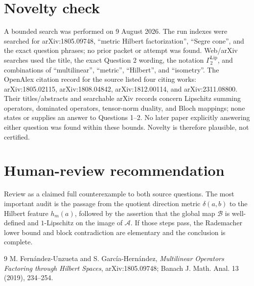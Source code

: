 \documentclass[11pt]{article}
\begin{document}
\section{Novelty check}

A bounded search was performed on 9 August 2026.  The run indexes were
searched for arXiv:1805.09748, ``metric Hilbert factorization'', ``Segre
cone'', and the exact question phrases; no prior packet or attempt was found.
Web/arXiv searches used the title, the exact Question 2 wording, the notation
$\Gamma_2^{\mathrm{Lip}}$, and combinations of ``multilinear'', ``metric'',
``Hilbert'', and ``isometry''.  The OpenAlex citation record for the source
listed four citing works: arXiv:1805.02115, arXiv:1808.04842,
arXiv:1812.00114, and arXiv:2311.08800.  Their titles/abstracts and searchable
arXiv records concern Lipschitz summing operators, dominated operators,
tensor-norm duality, and Bloch mappings; none states or supplies an answer to
Questions 1--2.  No later paper explicitly answering either question was
found within these bounds.  Novelty is therefore plausible, not certified.

\section{Human-review recommendation}

Review as a claimed full counterexample to both source questions.  The most
important audit is the passage from the quotient direction metric
$\delta(a,b)$ to the Hilbert feature $h_m(a)$, followed by the assertion that
the global map $\mathcal B$ is well-defined and $1$-Lipschitz on the image of
$\mathcal A$.  If those steps pass, the Rademacher lower bound and block
contradiction are elementary and the conclusion is complete.

\begin{thebibliography}{9}
M. Fern\'andez-Unzueta and S. Garc\'ia-Hern\'andez,
\emph{Multilinear Operators Factoring through Hilbert Spaces},
arXiv:1805.09748; Banach J. Math. Anal. 13 (2019), 234--254.
\end{thebibliography}
\end{document}
